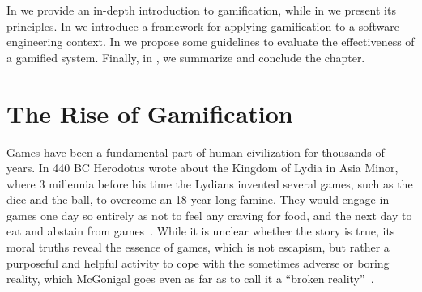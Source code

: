 In  we provide an in-depth introduction to gamification, while in  we present its principles.
In  we introduce a framework for applying gamification to a software engineering context.
In  we propose some guidelines to evaluate the effectiveness of a gamified system.
Finally, in , we summarize and conclude the chapter.
%
%
%
%
%
%



\section{The Rise of Gamification}\label{sec:gamification-intro}

Games have been a fundamental part of human civilization for thousands of years.
In 440 BC Herodotus wrote about the Kingdom of Lydia in Asia Minor, where 3 millennia before his time the Lydians invented several games, such as the dice and the ball, to overcome an 18 year long famine.
They would engage in games one day so entirely as not to feel any craving for food, and the next day to eat and abstain from games~\cite{Hero440a}.
While it is unclear whether the story is true, its moral truths reveal the essence of games, which is not escapism, but rather a purposeful and helpful activity to cope with the sometimes adverse or boring reality, which McGonigal goes even as far as to call it a ``broken reality''~\cite{McGo2011a}.

